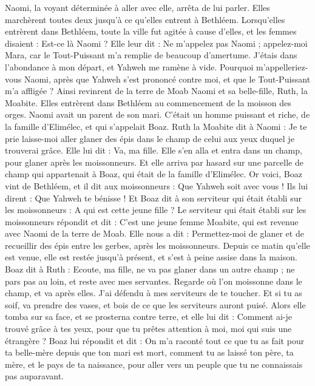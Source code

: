 \begin{multicols}{2}
Naomi, la voyant déterminée à aller avec elle, arrêta de lui parler.
Elles marchèrent toutes deux jusqu'à ce qu'elles entrent à Bethléem. Lorsqu'elles entrèrent dans Bethléem, toute la ville fut agitée à cause d'elles, et les femmes disaient : Est-ce là Naomi ?
Elle leur dit : Ne m'appelez pas Naomi ; appelez-moi Mara, car le Tout-Puissant m'a remplie de beaucoup d'amertume.
J’étais dans l'abondance à mon départ, et Yahweh me ramène à vide. Pourquoi m'appelleriez-vous Naomi, après que Yahweh s'est prononcé contre moi, et que le Tout-Puissant m'a affligée ?
Ainsi revinrent de la terre de Moab Naomi et sa belle-fille, Ruth, la Moabite. Elles entrèrent dans Bethléem au commencement de la moisson des orges.
\VerseOne{}Naomi avait un parent de son mari. C'était un homme puissant et riche, de la famille d'Elimélec, et qui s’appelait Boaz.
Ruth la Moabite dit à Naomi : Je te prie laisse-moi aller glaner des épis dans le champ de celui aux yeux duquel je trouverai grâce. Elle lui dit : Va, ma fille.
Elle s'en alla et entra dans un champ, pour glaner après les moissonneurs. Et elle arriva par hasard sur une parcelle de champ qui appartenait à Boaz, qui était de la famille d'Elimélec.
Or voici, Boaz vint de Bethléem, et il dit aux moissonneurs : Que Yahweh soit avec vous ! Ils lui dirent : Que Yahweh te bénisse !
Et Boaz dit à son serviteur qui était établi sur les moissonneurs : A qui est cette jeune fille ?
Le serviteur qui était établi sur les moissonneurs répondit et dit : C'est une jeune femme Moabite, qui est revenue avec Naomi de la terre de Moab.
Elle nous a dit : Permettez-moi de glaner et de recueillir des épis entre les gerbes, après les moissonneurs. Depuis ce matin qu'elle est venue, elle est restée jusqu'à présent, et s'est à peine assise dans la maison.
Boaz dit à Ruth : Ecoute, ma fille, ne va pas glaner dans un autre champ ; ne pars pas au loin, et reste avec mes servantes.
Regarde où l'on moissonne dans le champ, et va après elles. J'ai défendu à mes serviteurs de te toucher. Et si tu as soif, va prendre des vases, et bois de ce que les serviteurs auront puisé.
Alors elle tomba sur sa face, et se prosterna contre terre, et elle lui dit : Comment ai-je trouvé grâce à tes yeux, pour que tu prêtes attention à moi, moi qui suis une étrangère ?
Boaz lui répondit et dit : On m'a raconté tout ce que tu as fait pour ta belle-mère depuis que ton mari est mort, comment tu as laissé ton père, ta mère, et le pays de ta naissance, pour aller vers un peuple que tu ne connaissais pas auparavant.

\end{multicols}
